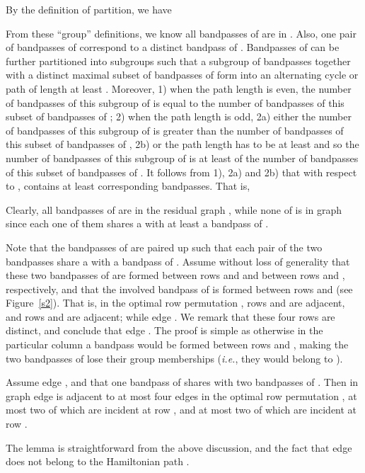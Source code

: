 \documentclass[11pt,twoside]{article}\usepackage{amssymb,latexsym,graphicx,hyperref}\usepackage{epstopdf}
\newenvironment{proof}{{\sc Proof. }}{\hfill\vspace{0.2in}}
\begin{document}
By the definition of partition, we have

From these ``group'' definitions, we know all bandpasses of  are in .
Also, one pair of bandpasses of  correspond to a distinct bandpass of .
Bandpasses of  can be further partitioned into subgroups such that
a subgroup of bandpasses together with a distinct maximal subset of bandpasses of  form into an alternating cycle or path of length at least .
Moreover,
1) when the path length is even, the number of bandpasses of this subgroup of  is equal to the number of bandpasses of this subset of bandpasses of ;
2) when the path length is odd,
2a) either the number of bandpasses of this subgroup of  is  greater than the number of bandpasses of this subset of bandpasses of ,
2b) or the path length has to be at least  and
so the number of bandpasses of this subgroup of  is at least  of the number of bandpasses of this subset of bandpasses of .
It follows from 1), 2a) and 2b) that with respect to ,  contains at least  corresponding bandpasses.
That is,

Clearly, all bandpasses of  are in the residual graph ,
while none of  is in graph  since each one of them shares a  with at least a bandpass of .


Note that the bandpasses of  are paired up such that each pair of the two bandpasses share a  with a bandpass of .
Assume without loss of generality that these two bandpasses of  are formed between rows  and  and between rows  and ,
respectively, and that the involved bandpass of  is formed between rows  and  (see Figure~\ref{s2}).
That is, in the optimal row permutation , rows  and  are adjacent, and rows  and  are adjacent;
while edge .
We remark that these four rows are distinct, and conclude that edge .
The proof is simple as otherwise in the particular column a bandpass would be formed between rows  and ,
making the two bandpasses of  lose their group memberships ({\it i.e.}, they would belong to ).


\begin{lemma}
\label{lemma2}
Assume edge , and that one bandpass of  shares  with two bandpasses of .
Then in graph  edge  is adjacent to at most four edges in the optimal row permutation ,
at most two of which are incident at row ,
and at most two of which are incident at row .
\end{lemma}
\begin{proof}
The lemma is straightforward from the above discussion, and the fact that edge  does not belong to the Hamiltonian path .
\end{proof}
\end{document}
